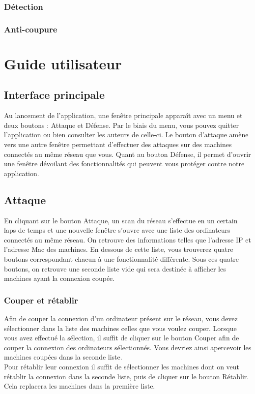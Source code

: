 \documentclass[11pt]{article}
\begin{document}
\subsubsection{Détection}
\subsubsection{Anti-coupure}

\section{Guide utilisateur}
\subsection{Interface principale}
Au lancement de l'application, une fenêtre principale apparaît avec un menu et deux boutons : Attaque et Défense. Par le biais du menu, vous pouvez quitter l'application ou bien consulter les auteurs de celle-ci. Le bouton d'attaque amène vers une autre fenêtre permettant d'effectuer des attaques sur des machines connectés au même réseau que vous. Quant au bouton Défense, il permet d'ouvrir une fenêtre dévoilant des fonctionnalités qui peuvent vous protéger contre notre application.

\subsection{Attaque}
En cliquant sur le bouton Attaque, un scan du réseau s'effectue en un certain laps de temps et une nouvelle fenêtre s'ouvre avec une liste des ordinateurs connectés au même réseau. On retrouve des informations telles que l'adresse IP et l'adresse Mac des machines. En dessous de cette liste, vous trouverez quatre boutons  correspondant chacun à une fonctionnalité différente. Sous ces quatre boutons, on retrouve une seconde liste vide qui sera destinée à afficher les machines ayant la connexion coupée.
\subsubsection{Couper et rétablir}
Afin de couper la connexion d'un ordinateur présent sur le réseau, vous devez sélectionner dans la liste des machines celles que vous voulez couper. Lorsque vous avez effectué la sélection, il suffit de cliquer sur le bouton Couper afin de couper la connexion des ordinateurs sélectionnés. Vous devriez ainsi apercevoir les machines coupées dans la seconde liste.~\\
Pour rétablir leur connexion il suffit de sélectionner les machines dont on veut rétablir la connexion dans la seconde liste, puis de cliquer sur le bouton Rétablir. Cela replacera les machines dans la première liste.
\end{document}
